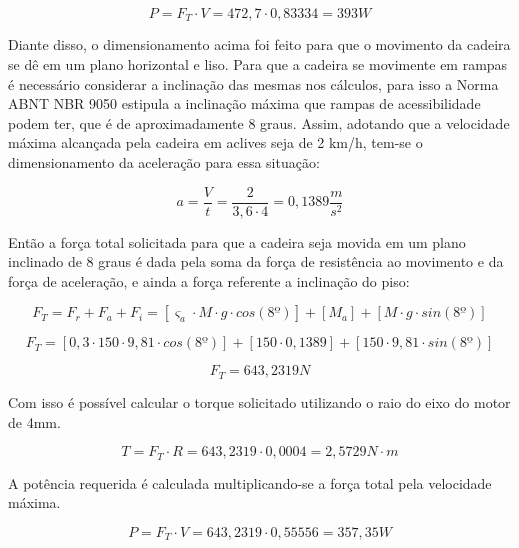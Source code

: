 \begin{equation}
P = F_{T} \cdot V = 472,7 \cdot 0,83334 = 393 W
\end{equation}

Diante disso, o dimensionamento acima foi feito para que o 
movimento da cadeira se dê em um plano horizontal e liso. 
Para que a cadeira se movimente em rampas é necessário considerar 
a inclinação das mesmas nos cálculos, para isso a Norma ABNT NBR 9050 \cite{nbr9050}
estipula a inclinação máxima que rampas de acessibilidade 
podem ter, que é de aproximadamente 8 graus. Assim, adotando que a velocidade 
máxima alcançada pela cadeira em aclives seja de 2 km/h, tem-se o 
dimensionamento da aceleração para essa situação: 

\begin{equation}
a = \frac{V}{t} = \frac{2}{3,6 \cdot 4} = 0,1389 \frac{m}{s^2}
\end{equation}

Então a força total solicitada para que a cadeira seja movida 
em um plano inclinado de 8 graus é dada pela soma da força de resistência 
ao movimento e da força de aceleração, e ainda a força referente a inclinação do piso:

\begin{equation}
F_{T} = F_{r} + F_{a} + F_{i} = [\varsigma_{a} \cdot M \cdot g \cdot cos(8º)] + [M_{a}] + [M \cdot g \cdot sin(8º)]
\end{equation}

\begin{equation}
F_{T} = [0,3 \cdot 150 \cdot 9,81 \cdot cos(8º)] + [150 \cdot 0,1389] + [150 \cdot 9,81 \cdot sin(8º)]
\end{equation}

\begin{equation}
F_{T} = 643,2319 N
\end{equation}

Com isso é possível calcular o torque solicitado utilizando o raio do eixo do motor de 4mm.

\begin{equation}
T = F_{T} \cdot R = 643,2319 \cdot 0,0004 = 2,5729 N \cdot m
\end{equation}

A potência requerida é calculada multiplicando-se a força total pela velocidade máxima.

\begin{equation}
P = F_{T} \cdot V = 643,2319 \cdot 0,55556 = 357,35 W
\end{equation}

